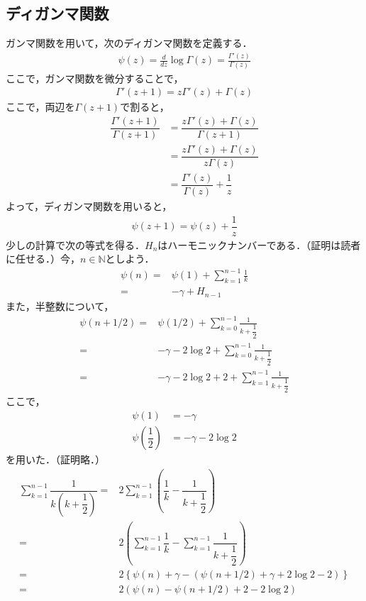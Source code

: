 \documentclass[12pt]{jsarticle}
\begin{document}
\subsection*{ディガンマ関数}
ガンマ関数を用いて，次のディガンマ関数を定義する．
\begin{align*}
\psi (z)={\frac  {d}{dz}}\log {\Gamma (z)}={\frac  {\Gamma '(z)}{\Gamma (z)}}
\end{align*}
ここで，ガンマ関数を微分することで，
\begin{align*}
\Gamma'(z+1) = z\Gamma'(z) + \Gamma(z)
\end{align*}
ここで，両辺を$\Gamma(z+1)$で割ると，
\begin{align*}
\dfrac{\Gamma'(z+1)}{\Gamma(z+1)} &= \dfrac{z\Gamma'(z) + \Gamma(z)}{\Gamma(z+1)} \\
&= \dfrac{z\Gamma'(z) + \Gamma(z)}{z\Gamma(z)} \\
&= \dfrac{\Gamma'(z)}{\Gamma(z)} + \dfrac{1}{z}
\end{align*}
よって，ディガンマ関数を用いると，
\begin{align*}
\psi(z+1) = \psi(z) + \dfrac{1}{z}
\end{align*}
少しの計算で次の等式を得る．$H_n$はハーモニックナンバーである．（証明は読者に任せる．）今，$n \in \mathbb{N}$としよう．
\begin{align*}
\psi (n)= & \psi(1) +\sum _{{k=1}}^{{n-1}}{\frac  {1}{k}}\\
= & -\gamma +H_{{n-1}}
\end{align*}
また，半整数について，
\begin{align*}
\psi (n+1/2) =& \psi\left( 1/ 2 \right)+\sum _{{k=0}}^{{n-1}}{\frac  {1}{k+\dfrac{1}{2}}} \\
=& -\gamma -2\log {2}+\sum _{{k=0}}^{{n-1}}{\frac  {1}{k+\dfrac{1}{2}}} \\
=& -\gamma -2\log {2}+ 2 + \sum _{{k=1}}^{{n-1}}{\frac  {1}{k+\dfrac{1}{2}}}
\end{align*}
ここで，
\begin{align*}
\psi(1) &= -\gamma \\
\psi\left( \dfrac{1}{2} \right) &= -\gamma -2\log 2
\end{align*}
を用いた．（証明略．）
\begin{align*}
\sum_{k=1}^{n-1}\dfrac{1}{k\left(k+\dfrac{1}{2}\right)} =& 2 \sum_{k=1}^{n-1} \left( \dfrac{1}{k} - \dfrac{1}{k+\dfrac{1}{2}} \right) \\
=& 2 \left( \sum_{k=1}^{n-1} \dfrac{1}{k} - \sum_{k=1}^{n-1} \dfrac{1}{k+\dfrac{1}{2}} \right) \\
=& 2 \left\{ \psi(n)+ \gamma - \left( \psi\left( n + 1/2 \right) + \gamma + 2\log 2 - 2 \right) \right\} \\
=& 2 \left( \psi(n) - \psi\left( n + 1/2 \right) + 2 - 2\log 2 \right)
\end{align*}
\end{document}
